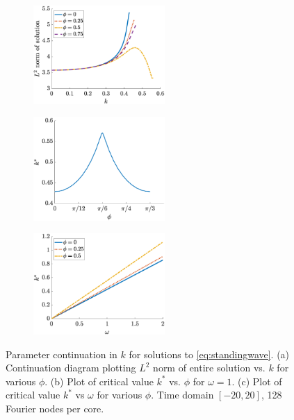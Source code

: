 \documentclass[11pt,reqno]{amsart}
\begin{document}
\begin{figure}
    \centering
    \begin{subfigure}{0.3\linewidth}
        \caption{}
        \label{fig:kcont2a}
        \includegraphics[width=5cm]{contkL2norm.eps}
    \end{subfigure}
    \begin{subfigure}{0.3\linewidth}
        \caption{}
        \label{fig:kcont2b}
        \includegraphics[width=5cm]{contkstarvsphi.eps}
    \end{subfigure}
    \begin{subfigure}{0.3\linewidth}
        \caption{}
        \label{fig:kcont2c}
        \includegraphics[width=5cm]{contkstarvsomega.eps}
    \end{subfigure}
    \caption{Parameter continuation in $k$ for solutions to \cref{eq:standingwave}. (a) Continuation diagram plotting $L^2$ norm of entire solution vs. $k$ for various $\phi$. (b) Plot of critical value $k^*$ vs. $\phi$ for $\omega = 1$. (c) Plot of critical value $k^*$ vs $\omega$ for various $\phi$. Time domain $[-20,20]$, 128 Fourier nodes per core.}
    \label{fig:kcont2}
\end{figure}
\end{document}
